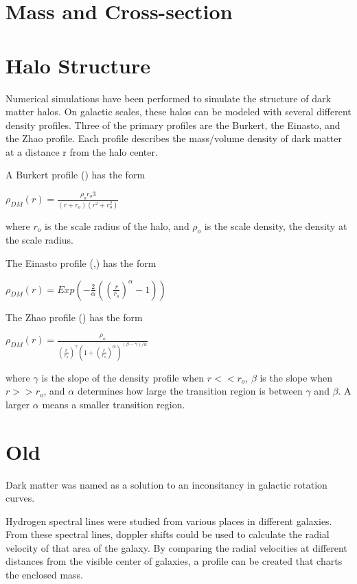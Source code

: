 \section{Mass and Cross-section}


\section{Halo Structure}
Numerical simulations have been performed to simulate the structure of dark matter halos.
On galactic scales, these halos can be modeled with several different density profiles.
Three of the primary profiles are the Burkert, the Einasto, and the Zhao profile.
Each profile describes the mass/volume density of dark matter at a distance r from the halo center.

A Burkert profile (\cite{burkertprofile}) has the form

$ \rho_{DM} \left( r \right) = \frac{ \rho_o r_o3}{ \left( r + r_o \right) \left( r^2 + r_o^2 \right)} $ \label{eqn:burkert}

where $r_o$ is the scale radius of the halo, and $\rho_o$ is the scale density, the density at the scale radius.

The Einasto profile (\cite{einastoprofile1},\cite{einastoprofile2}) has the form

$ \rho_{DM} \left( r \right) = Exp \left( - \frac{2}{\alpha} \left( {\left( \frac{r}{r_o} \right)}^{\alpha} - 1 \right) \right)$ \label{eqn:einasto}

The Zhao profile (\cite{zhaoprofile}) has the form

$ \rho_{DM} \left( r \right) = \frac{\rho_o}{ {\left( \frac{r}{r_o} \right)}^{\gamma} {\left( 1 + {\left( \frac{r}{r_o} \right)}^{\alpha} \right)}^{ \left(\beta - \gamma \right) / \alpha} } $ \label{eqn:zhao}

where $\gamma$ is the slope of the density profile when $r << r_o$, $\beta$ is the slope when $r >> r_o$, and $\alpha$ determines how large the transition region is between $\gamma$ and $\beta$.
A larger $\alpha$ means a smaller transition region.


\section{Old}

Dark matter was named as a solution to an inconsitancy in galactic rotation curves.

Hydrogen spectral lines were studied from various places in different galaxies.
From these spectral lines, doppler shifts could be used to calculate the radial velocity of that area of the galaxy.
By comparing the radial velocities at different distances from the visible center of galaxies, a profile can be created that charts the enclosed mass.

